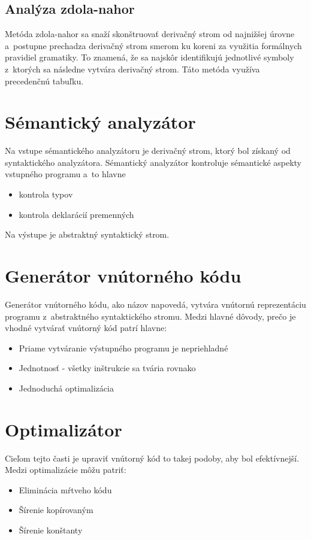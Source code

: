 \subsection{Analýza zdola-nahor}
Metóda zdola-nahor sa snaží skonštruovať derivačný strom od najnižšej úrovne a~postupne prechadza derivačný strom smerom ku koreni za využitia formálnych pravidiel gramatiky. To znamená, že sa najskôr identifikujú jednotlivé symboly z~ktorých sa následne vytvára derivačný strom. Táto metóda využíva precedenčnú tabuľku. \cite{aho}

\section{Sémantický analyzátor}
Na vstupe sémantického analyzátoru je derivačný strom, ktorý bol získaný od
syntaktického analyzátora. Sémantický analyzátor kontroluje sémantické aspekty
vstupného programu a~to hlavne 
\begin{itemize}
    \item kontrola typov
    \item kontrola deklarácií premenných
\end{itemize}
Na výstupe je abstraktný syntaktický strom.

\section{Generátor vnútorného kódu}
Generátor vnútorného kódu, ako názov napovedá, vytvára vnútornú reprezentáciu programu
z~abstraktného syntaktického stromu. Medzi hlavné dôvody, prečo je vhodné
vytvárať vnútorný kód patrí hlavne:
\begin{itemize}
    \item Priame vytváranie výstupného programu je nepriehladné
    \item Jednotnosť - všetky inštrukcie sa tvária rovnako
    \item Jednoduchá optimalizácia
\end{itemize}

\section{Optimalizátor}
Cieľom tejto časti je upraviť vnútorný kód to takej podoby, aby bol efektívnejší.
Medzi optimalizácie môžu patriť:
\begin{itemize}
    \item Eliminácia mŕtveho kódu
    \item Šírenie kopírovaným
    \item Šírenie konštanty
\end{itemize}

